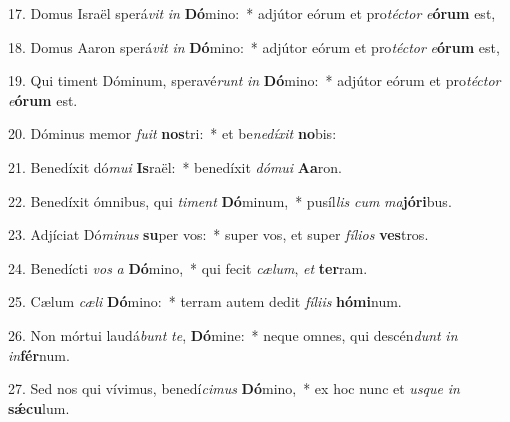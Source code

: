 17. Domus Israël sperá\textit{vit} \textit{in} \textbf{Dó}mino:~*  adjútor eórum et pro\textit{téc}\textit{tor} \textit{e}\textbf{ó}\textbf{rum} est,\

18. Domus Aaron sperá\textit{vit} \textit{in} \textbf{Dó}mino:~*  adjútor eórum et pro\textit{téc}\textit{tor} \textit{e}\textbf{ó}\textbf{rum} est,\

19. Qui timent Dóminum, speravé\textit{runt} \textit{in} \textbf{Dó}mino:~*  adjútor eórum et pro\textit{téc}\textit{tor} \textit{e}\textbf{ó}\textbf{rum} est.\

20. Dóminus memor \textit{fu}\textit{it} \textbf{nos}tri:~*  et be\textit{ne}\textit{dí}\textit{xit} \textbf{no}bis:\

21. Benedíxit dó\textit{mu}\textit{i} \textbf{Is}raël:~*  benedíxit \textit{dó}\textit{mu}\textit{i} \textbf{A}\textbf{a}ron.\

22. Benedíxit ómnibus, qui \textit{ti}\textit{ment} \textbf{Dó}minum,~*  pusíl\textit{lis} \textit{cum} \textit{ma}\textbf{jó}\textbf{ri}bus.\

23. Adjíciat Dó\textit{mi}\textit{nus} \textbf{su}per vos:~*  super vos, et super \textit{fí}\textit{li}\textit{os} \textbf{ves}tros.\

24. Benedícti \textit{vos} \textit{a} \textbf{Dó}mino,~*  qui fecit \textit{cæ}\textit{lum}, \textit{et} \textbf{ter}ram.\

25. Cælum \textit{cæ}\textit{li} \textbf{Dó}mino:~*  terram autem dedit \textit{fí}\textit{li}\textit{is} \textbf{hó}\textbf{mi}num.\

26. Non mórtui laudá\textit{bunt} \textit{te}, \textbf{Dó}mine:~*  neque omnes, qui descén\textit{dunt} \textit{in} \textit{in}\textbf{fér}num.\

27. Sed nos qui vívimus, benedí\textit{ci}\textit{mus} \textbf{Dó}mino,~*  ex hoc nunc et \textit{us}\textit{que} \textit{in} \textbf{sǽ}\textbf{cu}lum.\

